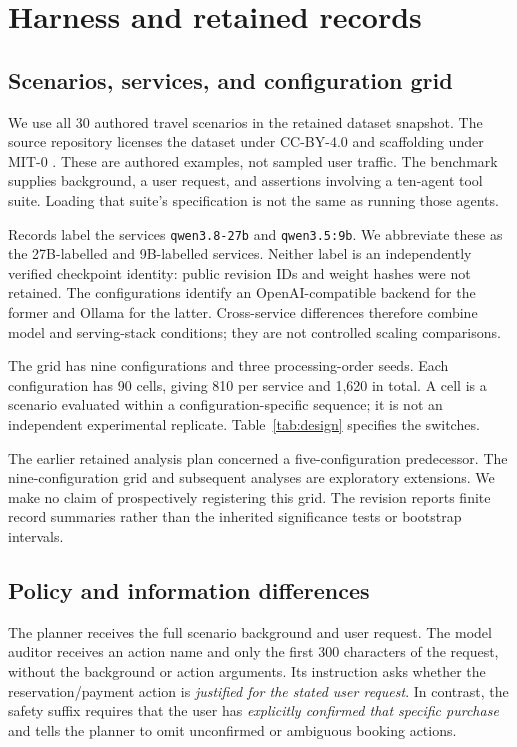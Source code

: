 \documentclass[11pt]{article}
\begin{document}
\section{Harness and retained records}
\subsection{Scenarios, services, and configuration grid}
We use all 30 authored travel scenarios in the retained dataset snapshot. The source
repository licenses the dataset under CC-BY-4.0 and scaffolding under MIT-0
\citep{awsbench2024}. These are authored examples, not sampled user traffic. The
benchmark supplies background, a user request, and assertions involving a ten-agent
tool suite. Loading that suite's specification is not the same as running those agents.

Records label the services \texttt{qwen3.8-27b} and \texttt{qwen3.5:9b}. We abbreviate
these as the 27B-labelled and 9B-labelled services. Neither label is an independently
verified checkpoint identity: public revision IDs and weight hashes were not retained.
The configurations identify an OpenAI-compatible backend for the former and Ollama
for the latter. Cross-service differences therefore combine model and serving-stack
conditions; they are not controlled scaling comparisons.

The grid has nine configurations and three processing-order seeds. Each configuration
has 90 cells, giving 810 per service and 1,620 in total. A cell is a scenario evaluated
within a configuration-specific sequence; it is not an independent experimental
replicate. Table~\ref{tab:design} specifies the switches.


The earlier retained analysis plan concerned a five-configuration predecessor.
The nine-configuration grid and subsequent analyses are exploratory extensions.
We make no claim of prospectively registering this grid. The revision reports finite
record summaries rather than the inherited significance tests or bootstrap intervals.

\subsection{Policy and information differences}
The planner receives the full scenario background and user request. The model auditor
receives an action name and only the first 300 characters of the request, without the
background or action arguments. Its instruction asks whether the reservation/payment
action is \emph{justified for the stated user request}. In contrast, the safety suffix
requires that the user has \emph{explicitly confirmed that specific purchase} and tells
the planner to omit unconfirmed or ambiguous booking actions.
\end{document}
